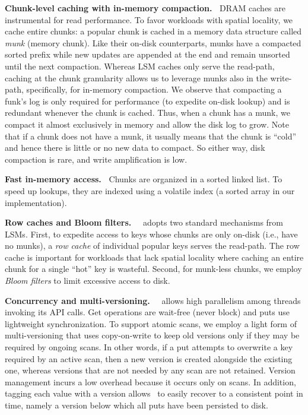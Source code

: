 {\bf Chunk-level caching with in-memory compaction.\ }
DRAM caches are instrumental for read performance. 
To favor workloads with spatial locality, we cache entire chunks:
a popular chunk is cached in a  memory data structure called \emph{munk} (memory chunk).
Like their on-disk counterparts, munks have a compacted sorted prefix while new updates are appended at the end and remain unsorted until the next compaction. 
Whereas LSM caches  only serve the read-path, caching at the chunk granularity allows us to 
leverage munks also in the write-path, specifically, for in-memory compaction.  
We observe that 
compacting a funk's log is only required for performance (to expedite on-disk lookup) and is redundant whenever the chunk is cached. Thus, when 
a chunk has a munk, we compact it almost exclusively in memory and allow the disk log to grow. 
Note that if a chunk does not have a munk, it usually means that the chunk is ``cold'' 
and hence there is little or no new data to compact. So either way,  disk compaction is rare, and write amplification is low.

{\bf Fast in-memory access.\ }
Chunks are organized in a sorted linked list. To speed up lookups, they are indexed using a volatile index (a sorted array in our implementation).  

 
 {\bf Row caches and Bloom filters.\ }
 \sys\ adopts two standard mechanisms from LSMs. First, to expedite access to  keys whose chunks are only on-disk  (i.e., have no munks), 
a \emph{row cache} of individual popular keys serves the read-path. The row cache is important for workloads that lack
spatial locality where caching an entire chunk for a single ``hot'' key is wasteful. 
Second, for munk-less chunks, we employ \emph{Bloom filters} to limit excessive access to disk. 

{\bf Concurrency and multi-versioning.\ }
 \sys\ allows high parallelism among threads invoking its API calls. 
 Get operations are wait-free (never block) and puts use lightweight synchronization. 
 To support atomic scans, we  employ a light form of multi-versioning that uses 
copy-on-write to keep old versions only if they may be required by ongoing scans. 
In other words, if a put attempts to overwrite a key required by an active scan, then a new version is created alongside the 
existing one, whereas versions that are not needed by any scan are not retained. 
Version management incurs a low overhead because it occurs only on scans. 
In addition, tagging each value with a version allows \sys\ to easily recover to a consistent point in time, namely a version below which all puts have been persisted to disk.


